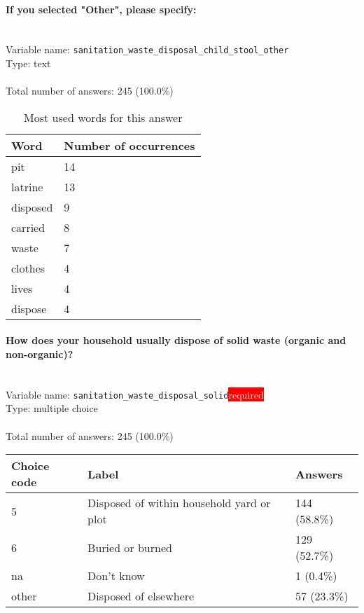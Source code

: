 \documentclass[11.5pt, a4paper]{scrartcl}
\begin{document}
\paragraph{If you selected "Other", please specify:}
\  \\Variable name: \texttt{sanitation\_waste\_disposal\_child\_stool\_other}\\
Type: text\\
\\Total number of answers: 245 (100.0\%)
\\[0.2em]\begin{table}[H]
 \begin{tabular}{p{4cm}|p{8cm}}
Word & Number of occurrences  \\
\hline
\cellcolor{mygray}pit&\cellcolor{mygray}14\\
\hline
latrine&13\\
\hline
\cellcolor{mygray}disposed&\cellcolor{mygray}9\\
\hline
carried&8\\
\hline
\cellcolor{mygray}waste&\cellcolor{mygray}7\\
\hline
clothes&4\\
\hline
\cellcolor{mygray}lives&\cellcolor{mygray}4\\
\hline
dispose&4\\
\hline
\end{tabular}
\caption{\label{tab:table-name} Most used words for this answer}
\end{table}
\paragraph{How does your household usually dispose of solid waste (organic and non-organic)? }
\  \\Variable name: \texttt{sanitation\_waste\_disposal\_solid}\hfill\colorbox{red}{\small{\textcolor{white}{required}}}\\
 Type: multiple choice\\
\\Total number of answers: 245 (100.0\%)
\\[0.2em] \begin{tabular}{p{4cm}|p{8cm}|p{3cm}}
Choice code & Label & Answers \\
\hline
5 & Disposed of within household yard or plot & \cellcolor{color2}144 (58.8\%)\\
\cellcolor{mygray} 6 & \cellcolor{mygray}Buried or burned  & \cellcolor{color2}129 (52.7\%)\\
na & Don’t know & \cellcolor{color0}1 (0.4\%)\\
\cellcolor{mygray} other & \cellcolor{mygray}Disposed of elsewhere  & \cellcolor{color1}57 (23.3\%)\\
\end{tabular}
\end{document}
